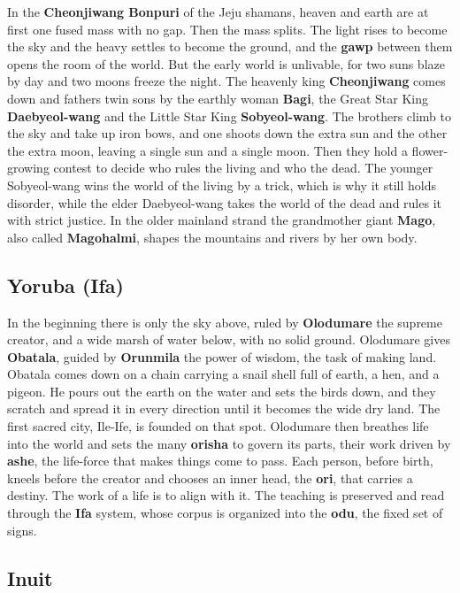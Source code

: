 In the \textbf{Cheonjiwang Bonpuri} of the Jeju shamans, heaven and earth are at first one fused mass with no gap. Then the mass splits. The light rises to become the sky and the heavy settles to become the ground, and the \textbf{gawp} between them opens the room of the world. But the early world is unlivable, for two suns blaze by day and two moons freeze the night. The heavenly king \textbf{Cheonjiwang} comes down and fathers twin sons by the earthly woman \textbf{Bagi}, the Great Star King \textbf{Daebyeol-wang} and the Little Star King \textbf{Sobyeol-wang}. The brothers climb to the sky and take up iron bows, and one shoots down the extra sun and the other the extra moon, leaving a single sun and a single moon. Then they hold a flower-growing contest to decide who rules the living and who the dead. The younger Sobyeol-wang wins the world of the living by a trick, which is why it still holds disorder, while the elder Daebyeol-wang takes the world of the dead and rules it with strict justice. In the older mainland strand the grandmother giant \textbf{Mago}, also called \textbf{Magohalmi}, shapes the mountains and rivers by her own body.

\subsection{Yoruba (Ifa)}

In the beginning there is only the sky above, ruled by \textbf{Olodumare} the supreme creator, and a wide marsh of water below, with no solid ground. Olodumare gives \textbf{Obatala}, guided by \textbf{Orunmila} the power of wisdom, the task of making land. Obatala comes down on a chain carrying a snail shell full of earth, a hen, and a pigeon. He pours out the earth on the water and sets the birds down, and they scratch and spread it in every direction until it becomes the wide dry land. The first sacred city, Ile-Ife, is founded on that spot. Olodumare then breathes life into the world and sets the many \textbf{orisha} to govern its parts, their work driven by \textbf{ashe}, the life-force that makes things come to pass. Each person, before birth, kneels before the creator and chooses an inner head, the \textbf{ori}, that carries a destiny. The work of a life is to align with it. The teaching is preserved and read through the \textbf{Ifa} system, whose corpus is organized into the \textbf{odu}, the fixed set of signs.

\subsection{Inuit}

